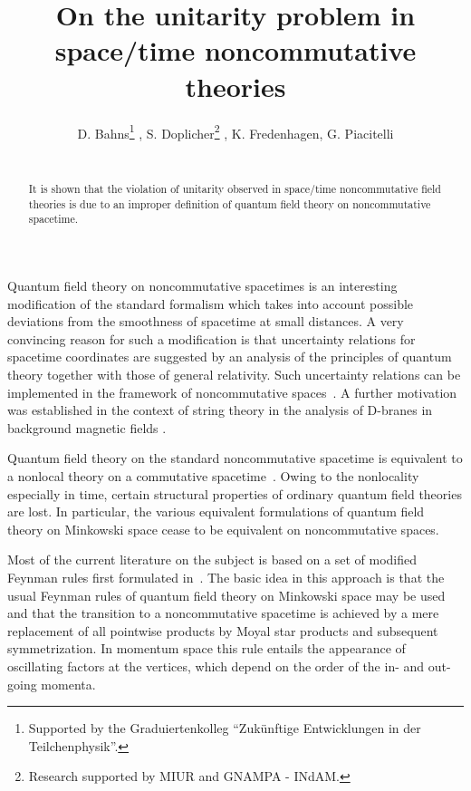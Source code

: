 \documentclass[a4paper,twoside,12pt]{article}
\title{\bf On the unitarity problem in space/time noncommutative theories}
\author{D. Bahns\thanks{Supported by the Graduiertenkolleg ``Zuk\"unftige Entwicklungen in der Teilchenphysik''.} , 
S. Doplicher\thanks{Research supported by MIUR and GNAMPA - INdAM.} , 
K. Fredenhagen\myHighlight{$^\ddag$}\coordHE{}, G. Piacitelli\myHighlight{$^\S$}\coordHE{}
\\\\
\myHighlight{$
\begin{array}{l}
\!\!\phantom{ }^* \phantom{ }^\ddag
\mbox{{\footnotesize II. Institut f\"ur Theoretische Physik, Universit\"at
Hamburg, Luruper Chaussee 149, }}
\\ \phantom{^*}\mbox{{\footnotesize D - 22761 Hamburg, Germany --
 {\tt bahns@mail.desy.de, fredenha@x4u2.desy.de}}}
\\^\dagger\mbox{{\footnotesize Dipartimento di Matematica
, Universit\`a di Roma ``La Sapienza'',
P.le Aldo Moro 2, }}
\\\phantom{^\dag}\mbox{{\footnotesize 00185 Roma, Italy --{
\tt dopliche@mat.uniroma1.it}}}
\\^\S\mbox{{\footnotesize Dipartimento di Matematica Pura ed Applicata,
Universit\`a di Padova,}} 
\\\phantom{^\S}\mbox{{\footnotesize  
Via G. Belzoni 7, 35131 Padova, Italy -- {\tt piacitel@math.unipd.it}}}
\end{array}$}\coordHE{}}
\date{}
\begin{document}
\maketitle


\begin{abstract}
\noindent It is shown that the violation of unitarity observed in space/time
noncommutative field theories is due to an improper definition of quantum field
theory on noncommutative spacetime.
\end{abstract}

\noindent Quantum field theory on noncommutative spacetimes is an interesting
modification of the standard formalism which takes into account possible
deviations from the smoothness of spacetime at small distances.  A very
convincing reason for such a modification is that uncertainty relations for
spacetime coordinates are suggested by an analysis of the principles of quantum
theory together with those of general relativity. Such uncertainty relations
can be implemented in the framework of noncommutative spaces~\cite{dfr}. A
further motivation was established in the context of string theory in the
analysis of D-branes in background magnetic fields \cite{schomerus}.

Quantum field theory on the standard noncommutative spacetime is equivalent to
a nonlocal theory on a commutative spacetime~\cite[\myHighlight{$\!\!\S$}\coordHE{} \,6]{dfr}. Owing to
the nonlocality especially in time, certain structural properties of ordinary
quantum field theories are lost. In particular, the various equivalent
formulations of quantum field theory on Minkowski space cease to be equivalent
on noncommutative spaces.

Most of the current literature on the subject is based on a set of modified
Feynman rules first formulated in~\cite{filk}. The basic idea in this
approach is that the usual Feynman rules of quantum field theory on Minkowski
space may be used and that the transition to a noncommutative spacetime is
achieved by a mere replacement of all pointwise products by Moyal
star products and subsequent symmetrization. In momentum space this rule
entails the appearance of oscillating factors at the vertices, which depend on
the order of the in- and out-going momenta.
\end{document}
